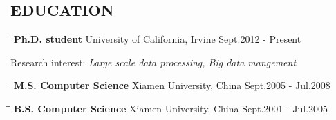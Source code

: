 \documentclass{res}
\begin{document}
\begin{resume}
\section{EDUCATION}          
   \vspace{-0.1in}	
   \begin{tabbing}
  \hspace{2in}\= \hspace{3in}\= \kill %
    {\bf Ph.D. student} \>  University of California, Irvine    \>Sept.2012 - Present\\
   \end{tabbing}\vspace{-30pt}      %
   Research interest:\emph{ Large scale data processing, Big data mangement}
   \vspace{-0.1in}	
   \begin{tabbing}
   \hspace{2in}\= \hspace{3in}\= \kill %
    {\bf M.S. Computer Science} \>Xiamen University, China     \>Sept.2005 - Jul.2008\\
   \end{tabbing}\vspace{-30pt}      %
   \vspace{-0.1in}	
   \begin{tabbing}
   \hspace{2in}\= \hspace{3in}\= \kill %
    {\bf B.S. Computer Science} \>Xiamen University, China     \>Sept.2001 - Jul.2005\\
   \end{tabbing}\vspace{-30pt}      %
 

\end{resume}
\end{document}

